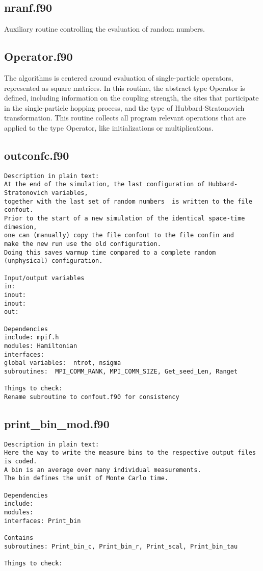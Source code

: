 \subsection{nranf.f90}
Auxiliary routine controlling the evaluation of random numbers. 
\clearpage
\subsection{Operator.f90}
The algorithms is centered around evaluation of single-particle operators, represented as square matrices. 
In this routine, the abstract type Operator is defined, including information on the coupling strength, the sites that participate in the single-particle hopping process, and the type of Hubbard-Stratonovich transformation. 
This routine collects all program relevant operations that are applied to the type Operator, like initializations or multiplications.
\clearpage
\subsection{outconfc.f90}
\begin{verbatim}
Description in plain text:
At the end of the simulation, the last configuration of Hubbard-Stratonovich variables, 
together with the last set of random numbers  is written to the file confout. 
Prior to the start of a new simulation of the identical space-time dimesion, 
one can (manually) copy the file confout to the file confin and 
make the new run use the old configuration. 
Doing this saves warmup time compared to a complete random (unphysical) configuration.

Input/output variables
in: 
inout: 
inout: 
out:

Dependencies
include: mpif.h
modules: Hamiltonian
interfaces: 
global variables:  ntrot, nsigma
subroutines:  MPI_COMM_RANK, MPI_COMM_SIZE, Get_seed_Len, Ranget

Things to check:
Rename subroutine to confout.f90 for consistency
\end{verbatim}


\clearpage
\subsection{print\_bin\_mod.f90}
\begin{verbatim}
Description in plain text:
Here the way to write the measure bins to the respective output files is coded.
A bin is an average over many individual measurements. 
The bin defines the unit of Monte Carlo time.

Dependencies
include: 
modules: 
interfaces: Print_bin

Contains
subroutines: Print_bin_c, Print_bin_r, Print_scal, Print_bin_tau

Things to check:
\end{verbatim}
